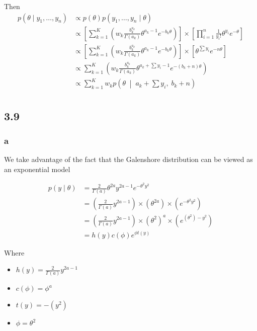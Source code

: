 \documentclass[
]{article}
\providecommand{\tightlist}{%
  \setlength{\itemsep}{0pt}\setlength{\parskip}{0pt}}
\begin{document}
Then \begin{align}
p(\theta \mid y_1, \dots, y_n) &\propto p(\theta) p(y_1, \dots, y_n \mid \theta) \\
&\propto \left[ \sum_{k = 1}^K \left( w_k \frac{b_k^{a_k}}{\Gamma(a_k)} \theta^{a_k - 1} e^{-b_k \theta} \right) \right] \times \left[ \prod_{i = 1}^n \frac{1}{y_i !} \theta^{y_i} e^{-\theta} \right] \\
&\propto \left[ \sum_{k = 1}^K \left( w_k \frac{b_k^{a_k}}{\Gamma(a_k)} \theta^{a_k - 1} e^{-b_k \theta} \right) \right] \times \left[ \theta^{\sum y_i} e^{-n\theta} \right] \\
&\propto \sum_{k = 1}^K \left( w_k \frac{b_k^{a_k}}{\Gamma(a_k)} \theta^{a_k + \sum y_i - 1} e^{-(b_k + n)\theta} \right) \\
&\propto \sum_{k = 1}^K w_k p\left(\theta \; \middle| \; a_k + \sum y_i, \; b_k + n \right) \\
\end{align}

\hypertarget{section-5}{%
\subsection{3.9}\label{section-5}}

\hypertarget{a-4}{%
\subsubsection{a}\label{a-4}}

We take advantage of the fact that the Galenshore distribution can be
viewed as an exponential model

\begin{align}
p(y \mid \theta) &= \frac{2}{\Gamma(a)} \theta^{2a} y^{2a - 1} e^{-\theta^2 y^2} \\
&= \left( \frac{2}{\Gamma(a)} y^{2a - 1} \right) \times \left(\theta^{2a} \right) \times \left( e^{-\theta^2 y^2} \right) \\
&= \left( \frac{2}{\Gamma(a)} y^{2a - 1} \right) \times \left(\theta^2 \right)^a \times \left( e^{\left(\theta^2\right) -y^2} \right) \\
&= h(y) c(\phi) e^{\phi t(y)}
\end{align}

Where

\begin{itemize}
\tightlist
\item
  \(h(y) = \frac{2}{\Gamma(a)} y^{2a - 1}\)
\item
  \(c(\phi) = \phi^a\)
\item
  \(t(y) = -(y^2)\)
\item
  \(\phi = \theta^2\)
\end{itemize}
\end{document}
